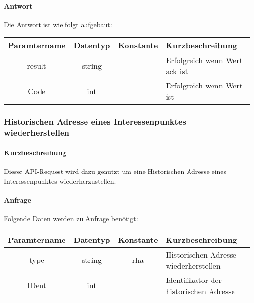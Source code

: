 \paragraph{Antwort}Die Antwort ist wie folgt aufgebaut:
\begin{table}[H]
	\begin{tabular}{|c|c|c|p{6.5cm}|}
		\hline
		\textbf{Paramtername} & \textbf{Datentyp} & \textbf{Konstante} & \textbf{Kurzbeschreibung}                                                                                               \\ \hline
		result              & string           &                 & Erfolgreich wenn Wert {\glqq ack\grqq} ist \\ \hline
		Code                & int              &                 & Erfolgreich wenn Wert {\glqq 0\grqq} ist \\ \hline
	\end{tabular}
\end{table}
\subsubsection{Historischen Adresse eines Interessenpunktes wiederherstellen}
\paragraph{Kurzbeschreibung}Dieser API-Request wird dazu genutzt um eine Historischen Adresse eines Interessenpunktes wiederherzustellen.
\paragraph{Anfrage}Folgende Daten werden zu Anfrage benötigt:
\begin{table}[H]
	\begin{tabular}{|c|c|c|p{6.5cm}|}
		\hline
		\textbf{Paramtername} & \textbf{Datentyp} & \textbf{Konstante} & \textbf{Kurzbeschreibung}                                                                                               \\ \hline
		type                & string            & rha                & Historischen Adresse wiederherstellen \\ \hline
		IDent               & int               &                    & Identifikator der historischen Adresse \\ \hline
	\end{tabular}
\end{table}
